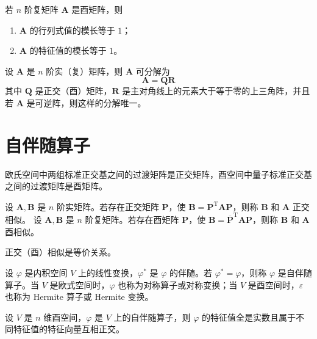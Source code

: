\begin{theorem}
    若 $n$ 阶复矩阵 $\bm{A}$ 是酉矩阵，则
    \begin{enumerate}
        \item $\bm{A}$ 的行列式值的模长等于 $1$；
        \item $\bm{A}$ 的特征值的模长等于 $1$。
    \end{enumerate}
\end{theorem}

\begin{theorem}
    设 $\bm{A}$ 是 $n$ 阶实（复）矩阵，则 $\bm{A}$ 可分解为
    \[
        \bm{A} = \bm{QR}
    \]
    其中 $\bm{Q}$ 是正交（酉）矩阵，$\bm{R}$ 是主对角线上的元素大于等于零的上三角阵，并且若 $\bm{A}$ 是可逆阵，则这样的分解唯一。
\end{theorem}



\section{自伴随算子}

\begin{lemma}
    欧氏空间中两组标准正交基之间的过渡矩阵是正交矩阵，酉空间中量子标准正交基之间的过渡矩阵是酉矩阵。
\end{lemma}

\begin{definition}
    设 $\bm{A}, \bm{B}$ 是 $n$ 阶实矩阵。若存在正交矩阵 $\bm{P}$，使 $\bm{B} = \bm{P}^{\mathrm{T}}\bm{AP}$，则称 $\bm{B}$ 和 $\bm{A}$ 正交相似。
    设 $\bm{A}, \bm{B}$ 是 $n$ 阶复矩阵。若存在酉矩阵 $\bm{P}$，使 $\bm{B} = \overline{\bm{P}}^{\mathrm{T}}\bm{AP}$，则称 $\bm{B}$ 和 $\bm{A}$ 酉相似。
\end{definition}

\begin{remark}
    正交（酉）相似是等价关系。
\end{remark}

\begin{definition}
    设 $\varphi$ 是内积空间 $V$ 上的线性变换，$\varphi^*$ 是 $\varphi$ 的伴随。若 $\varphi^* = \varphi$，则称 $\varphi$ 是自伴随算子。当 $V$ 是欧式空间时，$\varphi$ 也称为对称算子或对称变换；当 $V$ 是酉空间时，$\varepsilon$ 也称为 Hermite 算子或 Hermite 变换。
\end{definition}

\begin{theorem}
    设 $V$ 是 $n$ 维酉空间，$\varphi$ 是 $V$ 上的自伴随算子，则 $\varphi$ 的特征值全是实数且属于不同特征值的特征向量互相正交。
\end{theorem}

